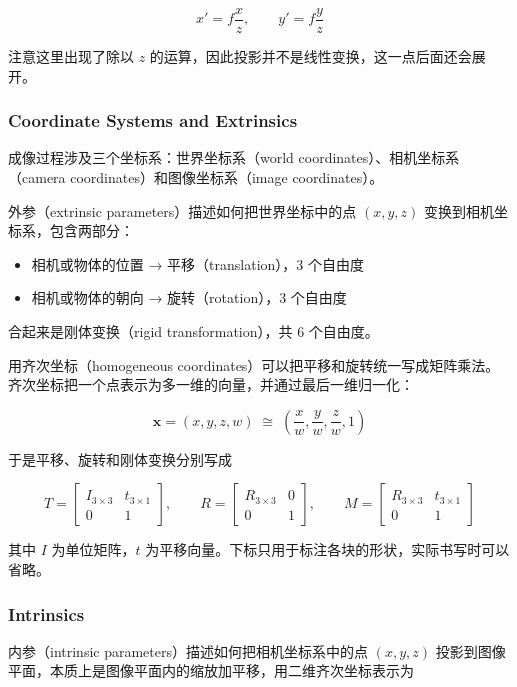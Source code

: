 \[
x' = f\frac{x}{z}, \qquad y' = f\frac{y}{z}
\]

注意这里出现了除以 $z$ 的运算，因此投影并不是线性变换，这一点后面还会展开。

\subsubsection{Coordinate Systems and Extrinsics}

成像过程涉及三个坐标系：世界坐标系（world coordinates）、相机坐标系（camera coordinates）和图像坐标系（image coordinates）。

外参（extrinsic parameters）描述如何把世界坐标中的点 $(x,y,z)$ 变换到相机坐标系，包含两部分：

\begin{itemize}
    \item 相机或物体的位置 → 平移（translation），3 个自由度
    \item 相机或物体的朝向 → 旋转（rotation），3 个自由度
\end{itemize}

合起来是刚体变换（rigid transformation），共 6 个自由度。

用齐次坐标（homogeneous coordinates）可以把平移和旋转统一写成矩阵乘法。齐次坐标把一个点表示为多一维的向量，并通过最后一维归一化：

\[
\boldsymbol{x} = (x, y, z, w) \;\cong\; \left(\frac{x}{w}, \frac{y}{w}, \frac{z}{w}, 1\right)
\]

于是平移、旋转和刚体变换分别写成

\[
T = \begin{bmatrix} I_{3\times3} & t_{3\times1} \\ 0 & 1 \end{bmatrix}, \qquad
R = \begin{bmatrix} R_{3\times3} & 0 \\ 0 & 1 \end{bmatrix}, \qquad
M = \begin{bmatrix} R_{3\times3} & t_{3\times1} \\ 0 & 1 \end{bmatrix}
\]

其中 $I$ 为单位矩阵，$t$ 为平移向量。下标只用于标注各块的形状，实际书写时可以省略。

\subsubsection{Intrinsics}

内参（intrinsic parameters）描述如何把相机坐标系中的点 $(x,y,z)$ 投影到图像平面，本质上是图像平面内的缩放加平移，用二维齐次坐标表示为

